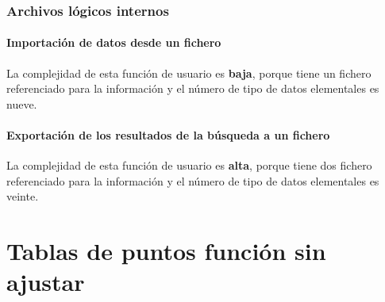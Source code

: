 \documentclass[11pt,a4paper,spanish,twoside]{book}
\begin{document}
\subsection{Archivos lógicos internos}
\subsubsection{Importación de datos desde un fichero}
La complejidad de esta función de usuario es \textbf{baja}, porque tiene un
fichero referenciado para la información y el número de tipo de datos
elementales es nueve.

\subsubsection{Exportación de los resultados de la búsqueda a un fichero}
La complejidad de esta función de usuario es \textbf{alta}, porque tiene dos
fichero referenciado para la información y el número de tipo de datos
elementales es veinte.

\chapter{Tablas de puntos función sin ajustar}
\end{document}
